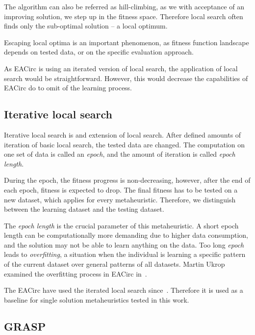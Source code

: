 \documentclass[
  print, %
  Table,   %
  nolof,     %
  nolot,     %
  11pt, %
  oneside  %
]{fithesis3}
\begin{document}
The algorithm can also be referred as hill-climbing, as we with acceptance of an improving solution, we step up in the fitness space. Therefore local search often finds only the sub-optimal solution -- a local optimum.

Escaping local optima is an important phenomenon, as fitness function landscape depends on tested data, or on the specific evaluation approach.

As EACirc is using an iterated version of local search, the application of local search would be straightforward. However, this would decrease the capabilities of EACirc do to omit of the learning process.

\subsection{Iterative local search}
\label{subsec:opt-single-sol-ils}

Iterative local search is and extension of local search. After defined amounts of iteration of basic local search, the tested data are changed. The computation on one set of data is called an \textit{epoch}, and the amount of iteration is called \textit{epoch length}.

During the epoch, the fitness progress is non-decreasing, however, after the end of each epoch, fitness is expected to drop. The final fitness has to be tested on a new dataset, which applies for every metaheuristic. Therefore, we distinguish between the learning dataset and the testing dataset.

The \textit{epoch length} is the crucial parameter of this metaheuristic. A short epoch length can be computationally more demanding due to higher data consumption, and the solution may not be able to learn anything on the data. Too long \textit{epoch} leads to \textit{overfitting}, a situation when the individual is learning a specific pattern of the current dataset over general patterns of all datasets. Martin Ukrop examined the overfitting process in EACirc in~\cite[chapter~7]{ukropBcThesis}.

The EACirc have used the iterated local search since~\cite{sys2014constructing}. Therefore it is used as a baseline for single solution metaheuristics tested in this work.

\subsection{GRASP}
\label{subsec:opt-single-sol-grasp}
\end{document}
